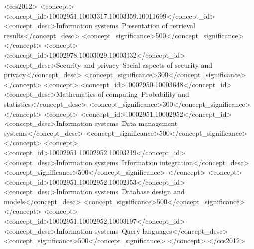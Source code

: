 \documentclass[11pt,sigconf]{acmart}
\begin{document}
%
%
\begin{CCSXML}
<ccs2012>
   <concept>
       <concept_id>10002951.10003317.10003359.10011699</concept_id>
       <concept_desc>Information systems~Presentation of retrieval results</concept_desc>
       <concept_significance>500</concept_significance>
       </concept>
   <concept>
       <concept_id>10002978.10003029.10003032</concept_id>
       <concept_desc>Security and privacy~Social aspects of security and privacy</concept_desc>
       <concept_significance>300</concept_significance>
       </concept>
   <concept>
       <concept_id>10002950.10003648</concept_id>
       <concept_desc>Mathematics of computing~Probability and statistics</concept_desc>
       <concept_significance>300</concept_significance>
       </concept>
   <concept>
       <concept_id>10002951.10002952</concept_id>
       <concept_desc>Information systems~Data management systems</concept_desc>
       <concept_significance>500</concept_significance>
       </concept>
   <concept>
       <concept_id>10002951.10002952.10003219</concept_id>
       <concept_desc>Information systems~Information integration</concept_desc>
       <concept_significance>500</concept_significance>
       </concept>
   <concept>
       <concept_id>10002951.10002952.10002953</concept_id>
       <concept_desc>Information systems~Database design and models</concept_desc>
       <concept_significance>500</concept_significance>
       </concept>
   <concept>
       <concept_id>10002951.10002952.10003197</concept_id>
       <concept_desc>Information systems~Query languages</concept_desc>
       <concept_significance>500</concept_significance>
       </concept>
 </ccs2012>
\end{CCSXML}



\end{document}
